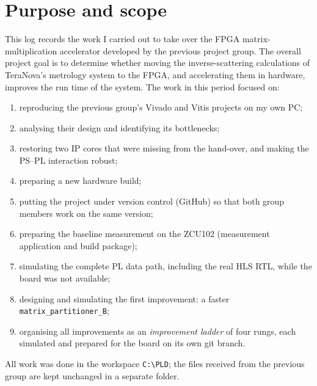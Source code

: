 \documentclass[11pt,a4paper]{article}
\newcommand{\code}[1]{\texttt{#1}}
\begin{document}
\section{Purpose and scope}
This log records the work I carried out to take over the FPGA matrix-multiplication accelerator developed by the previous project group. The overall project goal is to determine whether moving the inverse-scattering calculations of TeraNova's metrology system to the FPGA, and accelerating them in hardware, improves the run time of the system. The work in this period focused on:
\begin{enumerate}[noitemsep]
  \item reproducing the previous group's Vivado and Vitis projects on my own PC;
  \item analysing their design and identifying its bottlenecks;
  \item restoring two IP cores that were missing from the hand-over, and making the PS--PL interaction robust;
  \item preparing a new hardware build;
  \item putting the project under version control (GitHub) so that both group members work on the same version;
  \item preparing the baseline measurement on the ZCU102 (measurement application and build package);
  \item simulating the complete PL data path, including the real HLS RTL, while the board was not available;
  \item designing and simulating the first improvement: a faster \code{matrix\_partitioner\_B};
  \item organising all improvements as an \emph{improvement ladder} of four rungs, each simulated and prepared for the board on its own git branch.
\end{enumerate}

All work was done in the workspace \code{C:\textbackslash PLD}; the files received from the previous group are kept unchanged in a separate folder.

\end{document}
